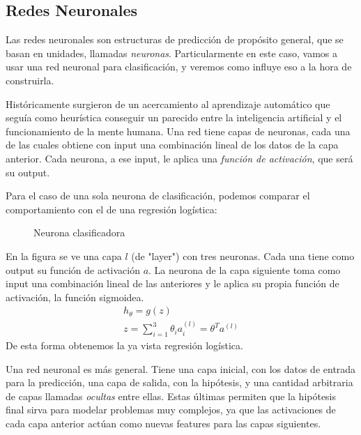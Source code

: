 \subsection{Redes Neuronales}
Las redes neuronales son estructuras de predicción de propósito general, que se basan en unidades, llamadas \emph{neuronas}. Particularmente en este caso, vamos a usar una red neuronal para clasificación, y veremos como influye eso a la hora de construirla.

Históricamente %
surgieron de un acercamiento al aprendizaje automático que seguía como heurística conseguir un parecido entre la inteligencia artificial y el funcionamiento de la mente humana. Una red tiene capas de neuronas, cada una de las cuales obtiene con input una combinación lineal de los datos de la capa anterior. Cada neurona, a ese input, le aplica una \emph{función de activación}, que será su output.

Para el caso de una sola neurona de clasificación, podemos comparar el comportamiento con el de una regresión logística:

\begin{figure}[h]
\centering
\def\svgwidth{0.25\columnwidth}
\caption{Neurona clasificadora}

\end{figure}

En la figura se ve una capa $l$ (de "layer") con tres neuronas. Cada una tiene como output su función de activación $a$. La neurona de la capa siguiente toma como input una combinación lineal de las anteriores y le aplica su propia función de activación, la función sigmoidea.
\begin{eqnarray}
 h_{\theta} = g(z)  \\
 z = \sum_{i = 1}^{3}\theta_i a_i^{(l)}=\theta^T a^{(l)}
\end{eqnarray}
De esta forma obtenemos la ya vista regresión logística.

Una red neuronal es más general. Tiene una capa inicial, con los datos de entrada para la predicción, una capa de salida, con la hipótesis, y una cantidad arbitraria de capas llamadas \emph{ocultas} entre ellas. Estas últimas permiten que la hipótesis final sirva para modelar problemas muy complejos, ya que las activaciones de cada capa anterior actúan como nuevas features para las capas siguientes.